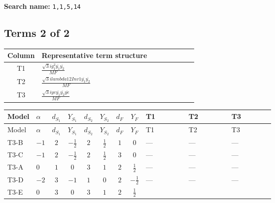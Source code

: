 \documentclass[8pt]{article}
\begin{document}
\begin{landscape}
\begin{longtable}{@{}llcccccc >{\raggedright\arraybackslash}p{0.21\linewidth} >{\raggedright\arraybackslash}p{0.21\linewidth} >{\raggedright\arraybackslash}p{0.21\linewidth}@{}}
\midrule
\bottomrule
\end{longtable}
\clearpage
\noindent\textbf{Search name: }\texttt{1,1,5,14}\par\smallskip
\subsection*{Terms 2 of 2}
\begin{center}
\begin{tabular}{@{}c >{\raggedright\arraybackslash}p{0.82\linewidth}@{}}
\toprule
Column & Representative term structure \\
\midrule
T1 & \(\displaystyle \frac{\sqrt{3} i g_{1}^{2} \overline{y_{1}} \overline{y_{2}}}{MF}\) \\
\midrule
T2 & \(\displaystyle \frac{\sqrt{3} i lambda12Inv1 \overline{y_{1}} \overline{y_{2}}}{MF}\) \\
\midrule
T3 & \(\displaystyle \frac{\sqrt{3} i ye \overline{y_{1}} \overline{y_{2}} \overline{ye}}{MF}\) \\
\midrule
\bottomrule
\end{tabular}
\end{center}
\smallskip
\tiny
\begin{longtable}{@{}llcccccc >{\raggedright\arraybackslash}p{0.21\linewidth} >{\raggedright\arraybackslash}p{0.21\linewidth} >{\raggedright\arraybackslash}p{0.21\linewidth}@{}}
\toprule
Model & $\alpha$ & $d_{S_1}$ & $Y_{S_1}$ & $d_{S_2}$ & $Y_{S_2}$ & $d_F$ & $Y_F$ & T1 & T2 & T3 \\
\midrule
\endfirsthead
\toprule
Model & $\alpha$ & $d_{S_1}$ & $Y_{S_1}$ & $d_{S_2}$ & $Y_{S_2}$ & $d_F$ & $Y_F$ & T1 & T2 & T3 \\
\midrule
\endhead
T3-B & $-1$ & $2$ & $-\frac{1}{2}$ & $2$ & $\frac{1}{2}$ & $1$ & $0$ & --- & --- & --- \\
\midrule
T3-C & $-1$ & $2$ & $-\frac{1}{2}$ & $2$ & $\frac{1}{2}$ & $3$ & $0$ & --- & --- & --- \\
\midrule
T3-A & $0$ & $1$ & $0$ & $3$ & $1$ & $2$ & $\frac{1}{2}$ & --- & --- & --- \\
\midrule
T3-D & $-2$ & $3$ & $-1$ & $1$ & $0$ & $2$ & $-\frac{1}{2}$ & --- & --- & --- \\
\midrule
T3-E & $0$ & $3$ & $0$ & $3$ & $1$ & $2$ & $\frac{1}{2}$ & \scriptsize\adjustbox{max width=\linewidth}{$\begin{gathered} - \frac{\sqrt{3} i g_{1}^{2} \overline{y_{1}} \overline{y_{2}}}{8 MF}\end{gathered}$} & \scriptsize\adjustbox{max width=\linewidth}{$\begin{gathered} \frac{\sqrt{3} i lambda12Inv1 \overline{y_{1}} \overline{y_{2}}}{6 MF}\end{gathered}$} & \scriptsize\adjustbox{max width=\linewidth}{$\begin{gathered} \frac{\sqrt{3} i ye \overline{y_{1}} \overline{y_{2}} \overline{ye}}{12 MF}\end{gathered}$} \\

\end{longtable}
\end{landscape}
\end{document}
